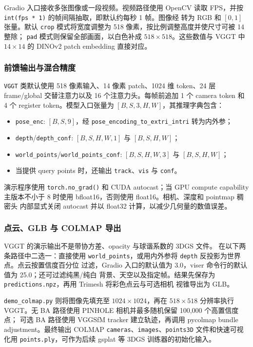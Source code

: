 Gradio 入口接收多张图像或一段视频。视频路径使用 OpenCV 读取 FPS，并按
\texttt{int(fps * 1)} 的帧间隔抽取，即默认约每秒 1 帧。图像经
 转为 RGB 和 $[0,1]$ 张量。默认
\texttt{crop} 模式将宽度调整为 518 像素，按比例调整高度并使尺寸可被 14 整除；
\texttt{pad} 模式则保留全部画面，以白色补成 $518\times 518$。这些数值与
VGGT 中 $14\times14$ 的 DINOv2 patch embedding 直接对应。

\subsubsection{前馈输出与混合精度}

\texttt{VGGT} 类默认使用 518 像素输入、14 像素 patch、1024 维 token、24 层
frame/global 交替注意力以及 16 个注意力头。每帧前追加 1 个 camera token 和 4 个
register token。模型入口张量为 $[B,S,3,H,W]$，其推理字典包含：
\begin{itemize}[itemsep=0.1em, topsep=0.3em]
  \item \texttt{pose\_enc}: $[B,S,9]$，经 \texttt{pose\_encoding\_to\_extri\_intri} 转为内外参；
  \item \texttt{depth}/\texttt{depth\_conf}: $[B,S,H,W,1]$ 与 $[B,S,H,W]$；
  \item \texttt{world\_points}/\texttt{world\_points\_conf}: $[B,S,H,W,3]$ 与 $[B,S,H,W]$；
  \item 当提供 query points 时，还输出 \texttt{track}、\texttt{vis} 与 \texttt{conf}。
\end{itemize}

演示程序使用 \texttt{torch.no\_grad()} 和 CUDA autocast；当 GPU compute capability
主版本不小于 8 时使用 bfloat16，否则使用 float16。相机、深度和 pointmap 稠密头
内部显式关闭 autocast 并以 float32 计算，以减少几何量的数值误差。

\subsubsection{点云、GLB 与 COLMAP 导出}

VGGT 的演示输出不是带协方差、opacity 与球谐系数的 3DGS 文件。
 在以下两条路径中二选一：直接使用
\texttt{world\_points}，或用内外参将 \texttt{depth} 反投影为世界点。点云按置信度百分位
过滤，Gradio 入口的默认值为 3.0，viser 命令行的默认值为 25.0；还可过滤纯黑/纯白
背景、天空以及指定帧。结果先保存为 \texttt{predictions.npz}，再用 Trimesh 将彩色点云与可选相机
视锥导出为 GLB。

\texttt{demo\_colmap.py} 则将图像先填充至 $1024\times1024$，再在 $518\times518$
分辨率执行 VGGT。无 BA 路径使用 PINHOLE 相机并最多随机保留 100,000 个高置信度点；
可选 BA 路径使用 VGGSfM tracker 建立轨迹，再调用 pycolmap bundle adjustment。最终输出
COLMAP \texttt{cameras}、\texttt{images}、\texttt{points3D} 文件和快速可视化用
\texttt{points.ply}，可作为后续 gsplat 等 3DGS 训练器的初始化输入。

